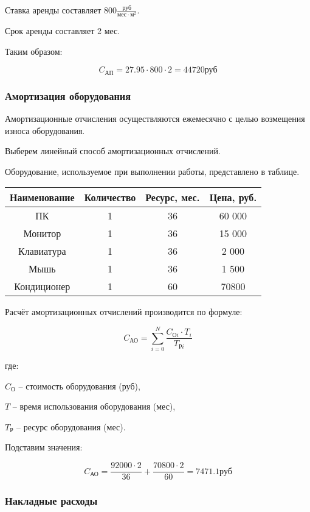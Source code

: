 Ставка аренды составляет $800 \frac{\text{руб}}{\text{мес}\cdot\text{м}^2}$.

Срок аренды составляет 2 мес.

Таким образом:

$$ C_\text{АП} = 27.95 \cdot 800 \cdot 2 = 44720\text{руб} $$

\subsubsection{Амортизация оборудования}

Амортизационные отчисления осуществляются ежемесячно с целью
возмещения износа оборудования.

Выберем линейный способ амортизационных отчислений.

Оборудование, используемое при выполнении работы, представлено в таблице.

\vspace{1em}

\begin{tabular}{|c|c|c|c|}
\hline
Наименование & Количество & Ресурс, мес. & Цена, руб. \\
\hline
ПК & 1 & 36 & 60 000 \\
\hline
Монитор & 1 & 36 & 15 000 \\
\hline
Клавиатура & 1 & 36 & 2 000 \\
\hline
Мышь & 1 & 36 & 1 500 \\
\hline
Кондиционер & 1 & 60 & 70800 \\
\hline
\end{tabular}

\vspace{1em}

Расчёт амортизационных отчислений производится по формуле:

$$ C_\text{АО} = \sum_{i=0}^{N} \frac{C_{\text{О}i} \cdot T_i}{T_{\text{Р}i}} $$

где:

$C_\text{О}$ -- стоимость оборудования (руб),

$T$ -- время использования оборудования (мес),

$T_\text{Р}$ -- ресурс оборудования (мес).

Подставим значения:

$$ C_\text{АО} = \frac{92000 \cdot 2}{36} +
\frac{70800 \cdot 2}{60} = 7471.1 \text{руб} $$

\subsubsection{Накладные расходы}

